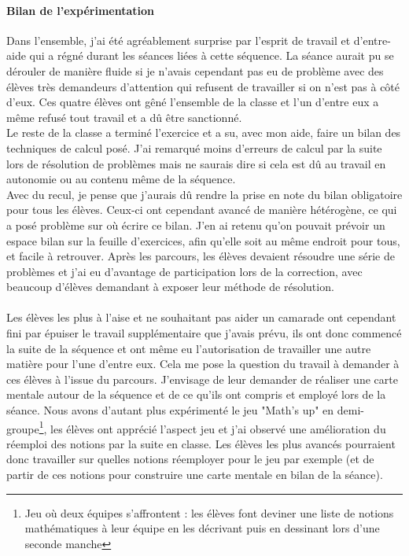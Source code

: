 \paragraph{Bilan de l'expérimentation\\}
Dans l'ensemble, j'ai été agréablement surprise par l'esprit de travail et d'entre-aide qui a régné durant les séances liées à cette séquence. La séance aurait pu se dérouler de manière fluide si je n'avais cependant pas eu de problème avec des élèves très demandeurs d'attention qui refusent de travailler si on n'est pas à côté d'eux. Ces quatre élèves ont gêné l'ensemble de la classe et l'un d'entre eux a même refusé tout travail et a dû être sanctionné.\\
Le reste de la classe a terminé l'exercice et a su, avec mon aide, faire un bilan des techniques de calcul posé. J'ai remarqué moins d'erreurs de calcul par la suite lors de résolution de problèmes mais ne saurais dire si cela est dû au travail en autonomie ou au contenu même de la séquence.\\
Avec du recul, je pense que j'aurais dû rendre la prise en note du bilan obligatoire pour tous les élèves. Ceux-ci ont cependant avancé de manière hétérogène, ce qui a posé problème sur où écrire ce bilan. J'en ai retenu qu'on pouvait prévoir un espace bilan sur la feuille d'exercices, afin qu'elle soit au même endroit pour tous, et facile à retrouver. Après les parcours, les élèves devaient résoudre une série de problèmes et j'ai eu d'avantage de participation lors de la correction, avec beaucoup d'élèves demandant à exposer leur méthode de résolution.
\paragraph{}Les élèves les plus à l'aise et ne souhaitant pas aider un camarade ont cependant fini par épuiser le travail supplémentaire que j'avais prévu, ils ont donc commencé la suite de la séquence et ont même eu l'autorisation de travailler une autre matière pour l'une d'entre eux. Cela me pose la question du travail à demander à ces élèves à l'issue du parcours. J'envisage de leur demander de réaliser une carte mentale autour de la séquence et de ce qu'ils ont compris et employé lors de la séance. Nous avons d'autant plus expérimenté le jeu "Math's up" en demi-groupe\footnote{Jeu où deux équipes s'affrontent : les élèves font deviner une liste de notions mathématiques à leur équipe en les décrivant puis en dessinant lors d'une seconde manche}, les élèves ont apprécié l'aspect jeu et j'ai observé une amélioration du réemploi des notions par la suite en classe. Les élèves les plus avancés pourraient donc travailler sur quelles notions réemployer pour le jeu par exemple (et de partir de ces notions pour construire une carte mentale en bilan de la séance).

